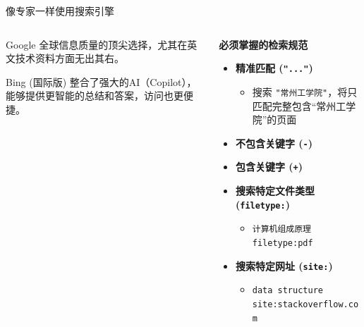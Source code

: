 \documentclass{beamer}
\begin{document}
\begin{frame}{像专家一样使用搜索引擎}
    \begin{columns}[T]
        \begin{column}{0.4\textwidth}

            \begin{alertblock}{Google}
                全球信息质量的顶尖选择，尤其在英文技术资料方面无出其右。
            \end{alertblock}

            \begin{alertblock}{Bing (国际版)}
                整合了强大的AI（Copilot），能够提供更智能的总结和答案，访问也更便捷。
            \end{alertblock}

            
        \end{column}
        
        \begin{column}{0.6\textwidth}
            \Large\textbf{必须掌握的检索规范}
            \begin{itemize}
                \item \textbf{精准匹配 (\texttt{"..."})}
                    \begin{itemize}
                    \item \small  搜索 \texttt{"常州工学院"}，将只匹配完整包含“常州工学院”的页面
                    \end{itemize}
                
                \item \textbf{不包含关键字 (\texttt{-})}

                \item \textbf{包含关键字 (\texttt{+})}
  
                \item \textbf{搜索特定文件类型 (\texttt{filetype:})}
                    \begin{itemize}
                    \item \small  \texttt{计算机组成原理 filetype:pdf}
                    \end{itemize}

                \item \textbf{搜索特定网址 (\texttt{site:})}
                    \begin{itemize}
                    \item \small  \texttt{data structure site:stackoverflow.com}
                    \end{itemize}
            \end{itemize}
        \end{column}
    \end{columns}
\end{frame}
\end{document}

